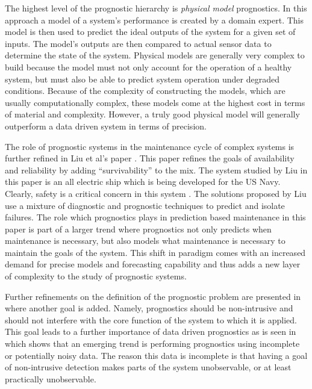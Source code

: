 \documentclass[12pt]{article}
\begin{document}
The highest level of the prognostic hierarchy is {\em physical model}
prognostics.  In this approach a model of a system's performance is
created by a domain expert.  This model is then used to predict the
ideal outputs of the system for a given set of inputs.  The model's
outputs are then compared to actual sensor data to determine the state
of the system.  Physical models are generally very complex to build
because the model must not only account for the operation of a healthy
system, but must also be able to predict system operation under
degraded conditions.  Because of the complexity of constructing the
models, which are usually computationally complex, these models come
at the highest cost in terms of material and complexity.  However, a
truly good physical model will generally outperform a data driven
system in terms of precision.

The role of prognostic systems in the maintenance cycle of complex
systems is further refined in Liu et al's paper \cite{4273732}.  This
paper refines the goals of availability and reliability by adding
``survivability'' to the mix.  The system studied by Liu in this paper
is an all electric ship which is being developed for the US Navy.
Clearly, safety is a critical concern in this system .  The solutions
proposed by Liu use a mixture of diagnostic and prognostic techniques
to predict and isolate failures.  The role which prognostics plays in
prediction based maintenance in this paper is part of a larger trend
where prognostics not only predicts when maintenance is necessary, but
also models what maintenance is necessary to maintain the goals of the
system.  This shift in paradigm comes with an increased demand for
precise models and forecasting capability and thus adds a new layer of
complexity to the study of prognostic systems.

Further refinements on the definition of the prognostic problem are
presented in \cite{4585821} where another goal is added.  Namely,
prognostics should be non-intrusive and should not interfere with the
core function of the system to which it is applied.  This goal leads
to a further importance of data driven prognostics as is seen in
\cite{5393625} which shows that an emerging trend is performing
prognostics using incomplete or potentially noisy data.  The reason
this data is incomplete is that having a goal of non-intrusive
detection makes parts of the system unobservable, or at least
practically unobservable.
\end{document}
